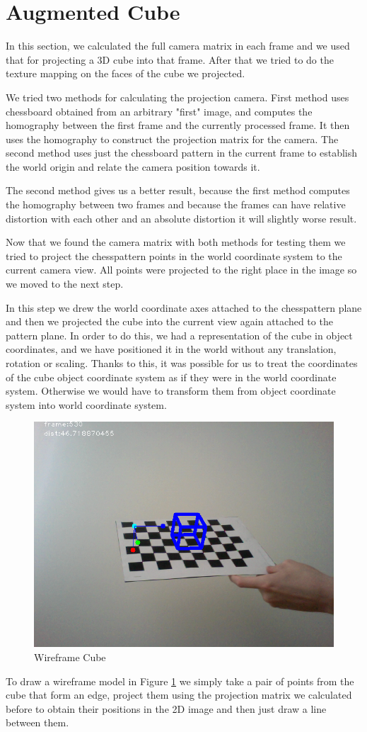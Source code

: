 \section{Augmented Cube}
In this section, we calculated the full camera matrix in each frame and we used that for projecting a 3D cube into that frame. After that we tried to do the texture mapping on the faces of the cube we projected.

We tried two methods for calculating the projection camera. First method uses chessboard obtained from an arbitrary "first" image, and computes the homography between the first frame and the currently processed frame. It then uses the homography to construct the projection matrix for the camera. The second method uses just the chessboard pattern in the current frame to establish the world origin and relate the camera position towards it.

The second method gives us a better result, because the first method computes the homography between two frames and because the frames can have relative distortion with each other and an absolute distortion it will slightly worse result.

Now that we found the camera matrix with both methods for testing them we tried to project the chesspattern points in the world coordinate system to the current camera view. All points were projected to the right place in the image so we moved to the next step.

In this step we drew the world coordinate axes attached to the chesspattern plane and then we projected the cube into the current view again attached to the pattern plane. In order to do this, we had a representation of the cube in object coordinates, and we have positioned it in the world without any translation, rotation or scaling. Thanks to this, it was possible for us to treat the coordinates of the cube object coordinate system as if they were in the world coordinate system. Otherwise we would have to transform them from object coordinate system into world coordinate system.

 \begin{figure}[h!]
	\centering
	\includegraphics[width=\textwidth]{Handin3/images/wireframe.png}
	\caption{Wireframe Cube}
	\label{fig:wireframe}
\end{figure}

To draw a wireframe model in Figure \ref{fig:wireframe} we simply take a pair of points from the cube that form an edge, project them using the projection matrix we calculated before to obtain their positions in the 2D image and then just draw a line between them.
